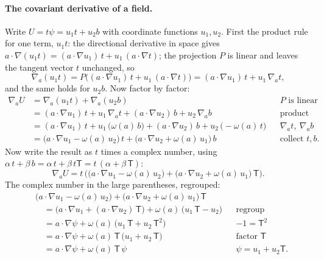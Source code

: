 \paragraph{The covariant derivative of a field.} Write $U = t\psi = u_1 t + u_2 b$ with coordinate functions $u_1, u_2$. First the product rule for one term, $u_1 t$: the directional derivative in space gives $a\cdot\nabla(u_1 t) = (a\cdot\nabla u_1)\, t + u_1\,(a\cdot\nabla t)$; the projection $P$ is linear and leaves the tangent vector $t$ unchanged, so
\begin{equation*}
\nabla_a(u_1 t) = P\big((a\cdot\nabla u_1)\, t + u_1\,(a\cdot\nabla t)\big) = (a\cdot\nabla u_1)\, t + u_1\,\nabla_a t ,
\end{equation*}
and the same holds for $u_2 b$. Now factor by factor:
\begin{align*}
\nabla_a U &= \nabla_a(u_1 t) + \nabla_a(u_2 b) && P \text{ is linear} \\
&= (a\cdot\nabla u_1)\, t + u_1\,\nabla_a t + (a\cdot\nabla u_2)\, b + u_2\,\nabla_a b && \text{product rule} \\
&= (a\cdot\nabla u_1)\, t + u_1\,\big(\omega(a)\, b\big) + (a\cdot\nabla u_2)\, b + u_2\,\big(-\omega(a)\, t\big) && \nabla_a t,\ \nabla_a b \\
&= \big(a\cdot\nabla u_1 - \omega(a)\, u_2\big)\, t + \big(a\cdot\nabla u_2 + \omega(a)\, u_1\big)\, b && \text{collect } t, b .
\end{align*}
Now write the result as $t$ times a complex number, using $\alpha\, t + \beta\, b = \alpha\, t + \beta\, t\mathsf T = t\,(\alpha + \beta\,\mathsf T)$:
\begin{equation*}
\nabla_a U = t\,\Big(\big(a\cdot\nabla u_1 - \omega(a)\, u_2\big) + \big(a\cdot\nabla u_2 + \omega(a)\, u_1\big)\,\mathsf T\Big) .
\end{equation*}
The complex number in the large parentheses, regrouped:
\begin{align*}
&\big(a\cdot\nabla u_1 - \omega(a)\, u_2\big) + \big(a\cdot\nabla u_2 + \omega(a)\, u_1\big)\,\mathsf T \\
&\quad= \big(a\cdot\nabla u_1 + (a\cdot\nabla u_2)\,\mathsf T\big) + \omega(a)\,\big(u_1\,\mathsf T - u_2\big) && \text{regroup} \\
&\quad= a\cdot\nabla\psi + \omega(a)\,\big(u_1\,\mathsf T + u_2\,\mathsf T^2\big) && -1 = \mathsf T^2 \\
&\quad= a\cdot\nabla\psi + \omega(a)\,\mathsf T\,\big(u_1 + u_2\,\mathsf T\big) && \text{factor } \mathsf T \\
&\quad= a\cdot\nabla\psi + \omega(a)\,\mathsf T\,\psi && \psi = u_1 + u_2\mathsf T .
\end{align*}
